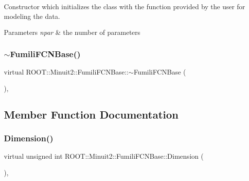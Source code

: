 Constructor which initializes the class with the function provided by the user for modeling the data.


\begin{DoxyParams}{Parameters}
{\em npar} & the number of parameters \\
\hline
\end{DoxyParams}
\mbox{\label{classROOT_1_1Minuit2_1_1FumiliFCNBase_a94961223a3baa0a131461be70a55a4e3}} 
\subsubsection{\texorpdfstring{$\sim$FumiliFCNBase()}{~FumiliFCNBase()}\hspace{0.1cm}{\footnotesize\ttfamily [3/3]}}
{\footnotesize\ttfamily virtual R\+O\+O\+T\+::\+Minuit2\+::\+Fumili\+F\+C\+N\+Base\+::$\sim$\+Fumili\+F\+C\+N\+Base (\begin{DoxyParamCaption}{ }\end{DoxyParamCaption})\hspace{0.3cm}{\ttfamily [inline]}, {\ttfamily [virtual]}}



\subsection{Member Function Documentation}
\mbox{\label{classROOT_1_1Minuit2_1_1FumiliFCNBase_ab8056ffdfd619915e22f1310db0644a6}} 
\subsubsection{\texorpdfstring{Dimension()}{Dimension()}\hspace{0.1cm}{\footnotesize\ttfamily [1/3]}}
{\footnotesize\ttfamily virtual unsigned int R\+O\+O\+T\+::\+Minuit2\+::\+Fumili\+F\+C\+N\+Base\+::\+Dimension (\begin{DoxyParamCaption}{ }\end{DoxyParamCaption})\hspace{0.3cm}{\ttfamily [inline]}, {\ttfamily [virtual]}}

